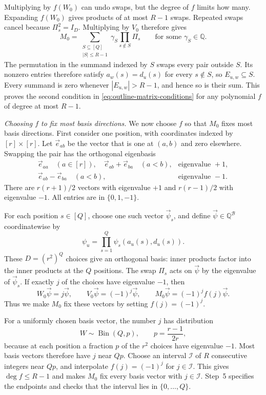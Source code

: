\documentclass[11pt,reqno]{amsart}
\numberwithin{equation}{section}
\theoremstyle{definition}\newtheorem{definition}[theorem]{Definition}
\theoremstyle{remark}\newtheorem{remark}[theorem]{Remark}
\renewcommand{\le}{\leqslant}
\begin{document}
Multiplying by $f(W_0)$ can undo swaps, but the degree of $f$
limits how many. Expanding $f(W_0)$ gives products of at most
$R-1$ swaps. Repeated swaps cancel because $\Pi_s^2=I_D$.
Multiplying by $V_0$ therefore gives
\begin{equation}\label{eq:overview-partial-swaps}
 M_0=\sum_{\substack{S\subseteq[Q]\\|S|\le R-1}}
             \gamma_S\prod_{s\notin S}\Pi_s
 \qquad\text{for some }\gamma_S\in\mathbb Q.
\end{equation}
The permutation in the summand indexed by $S$ swaps every pair
outside $S$. Its nonzero entries therefore satisfy
$a_w(s)=d_u(s)$ for every $s\notin S$, so $E_{u,w}\subseteq S$.
Every summand is zero whenever $|E_{u,w}|>R-1$, and hence so is
their sum. This proves the second condition in
\eqref{eq:outline-matrix-conditions} for any polynomial $f$ of
degree at most $R-1$.

\smallskip\noindent
\emph{Choosing $f$ to fix most basis directions.}
We now choose $f$ so that $M_0$ fixes most basis directions.
First consider one position, with coordinates indexed by
$[r]\times[r]$. Let $\vec e_{ab}$ be the vector that is one
at $(a,b)$ and zero elsewhere. Swapping the pair has the
orthogonal eigenbasis
\[
 \begin{array}{ll}
 \vec e_{aa}\quad(a\in[r]),\quad
 \vec e_{ab}+\vec e_{ba}\quad(a<b),
     &\text{eigenvalue }+1,\\[2pt]
 \vec e_{ab}-\vec e_{ba}\quad(a<b),
     &\text{eigenvalue }-1.
 \end{array}
\]
There are $r(r+1)/2$ vectors with eigenvalue $+1$ and
$r(r-1)/2$ with eigenvalue $-1$. All entries are in $\{0,1,-1\}$.

For each position $s\in[Q]$, choose one such vector $\vec\psi_s$,
and define $\vec\psi\in\mathbb Q^{\mathcal B}$ coordinatewise by
\[
 \psi_u=\prod_{s=1}^Q\psi_s(a_u(s),d_u(s)).
\]
These $D=(r^2)^Q$ choices give an orthogonal basis: inner products
factor into the inner products at the $Q$ positions.
The swap $\Pi_s$ acts on $\vec\psi$ by the eigenvalue of
$\vec\psi_s$. If exactly $j$ of the choices have eigenvalue $-1$,
then
\[
 W_0\vec\psi=j\vec\psi,\qquad
 V_0\vec\psi=(-1)^j\vec\psi,\qquad
 M_0\vec\psi=(-1)^jf(j)\vec\psi.
\]
Thus we make $M_0$ fix these vectors by setting $f(j)=(-1)^j$.

For a uniformly chosen basis vector, the number $j$ has distribution
\[
 W\sim\operatorname{Bin}(Q,p),\qquad p=\frac{r-1}{2r},
\]
because at each position a fraction $p$ of the $r^2$ choices have
eigenvalue $-1$. Most basis vectors therefore have $j$ near $Qp$.
Choose an interval $\mathcal I$ of $R$ consecutive integers near
$Qp$, and interpolate $f(j)=(-1)^j$ for $j\in\mathcal I$.
This gives $\deg f\le R-1$ and makes $M_0$ fix every basis
vector with $j\in\mathcal I$. Step~5 specifies the endpoints
and checks that the interval lies in $\{0,\ldots,Q\}$.
\end{document}
